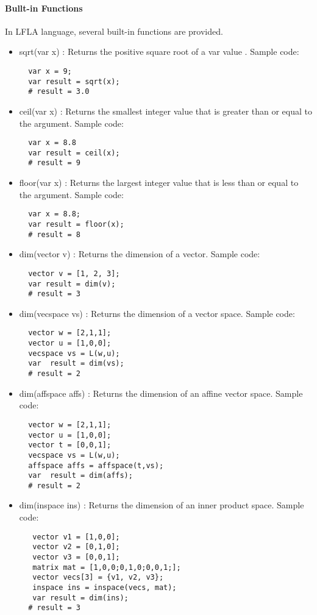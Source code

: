 \documentclass[12pt]{article} %
\begin{document}
 

\paragraph{Bullt-in Functions}
In LFLA language, several built-in functions are provided.
\begin{itemize}
\item sqrt(var x) :
 Returns the positive square root of a var value . Sample code:
\begin{lstlisting}
  var x = 9;
  var result = sqrt(x);
  # result = 3.0
\end{lstlisting}
\item ceil(var x)
: Returns the smallest integer value that is greater than or equal to the argument. Sample code:
\begin{lstlisting}
  var x = 8.8
  var result = ceil(x);
  # result = 9
\end{lstlisting}

\item floor(var x)
: Returns the largest integer value that is less than or equal to the argument. Sample code:
\begin{lstlisting}
  var x = 8.8;
  var result = floor(x);
  # result = 8
\end{lstlisting}

\item dim(vector v)
: Returns the dimension of a vector. Sample code:
\begin{lstlisting}
  vector v = [1, 2, 3];
  var result = dim(v);
  # result = 3
\end{lstlisting}

\item dim(vecspace vs)
: Returns the dimension of a vector space. Sample code:
\begin{lstlisting}
  vector w = [2,1,1];
  vector u = [1,0,0];
  vecspace vs = L(w,u);
  var  result = dim(vs);
  # result = 2
\end{lstlisting}

\item dim(affspace  affs)
: Returns the dimension of an affine vector space. Sample code:
\begin{lstlisting}
  vector w = [2,1,1];
  vector u = [1,0,0];
  vector t = [0,0,1];
  vecspace vs = L(w,u);
  affspace affs = affspace(t,vs);
  var  result = dim(affs);
  # result = 2
\end{lstlisting}

\item dim(inspace  ins)
: Returns the dimension of an inner product  space. Sample code:
\begin{lstlisting}
   vector v1 = [1,0,0];
   vector v2 = [0,1,0];
   vector v3 = [0,0,1]; 
   matrix mat = [1,0,0;0,1,0;0,0,1;];
   vector vecs[3] = {v1, v2, v3};
   inspace ins = inspace(vecs, mat); 
   var result = dim(ins);
  # result = 3
\end{lstlisting}


\end{itemize}
\end{document}
